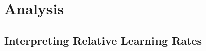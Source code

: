 \documentclass{article} %
\begin{document}


    \section{Analysis}

    \label{sec:analysis}

    \subsection{Interpreting Relative Learning Rates}
\end{document}
